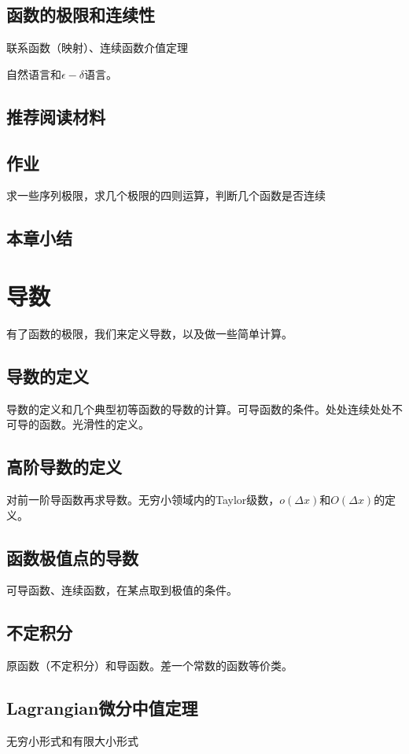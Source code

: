 \documentclass{ctexbook}
\newcommand{\ChapLabel}[1]{\label{#1}}
\begin{document}
\section{函数的极限和连续性}
联系函数（映射）、连续函数介值定理

自然语言和$\epsilon-\delta$语言。

\section{推荐阅读材料}

\section{作业}
求一些序列极限，求几个极限的四则运算，判断几个函数是否连续

\section{本章小结}


\chapter{导数}
\ChapLabel{Chap:Derivative}
有了函数的极限，我们来定义导数，以及做一些简单计算。

\section{导数的定义}
导数的定义和几个典型初等函数的导数的计算。可导函数的条件。处处连续处处不可导的函数。光滑性的定义。

\section{高阶导数的定义}
对前一阶导函数再求导数。无穷小领域内的Taylor级数，$o(\Delta x)$和$O(\Delta x)$的定义。

\section{函数极值点的导数}
可导函数、连续函数，在某点取到极值的条件。

\section{不定积分}
原函数（不定积分）和导函数。差一个常数的函数等价类。

\section{Lagrangian微分中值定理}
无穷小形式和有限大小形式
\end{document}
